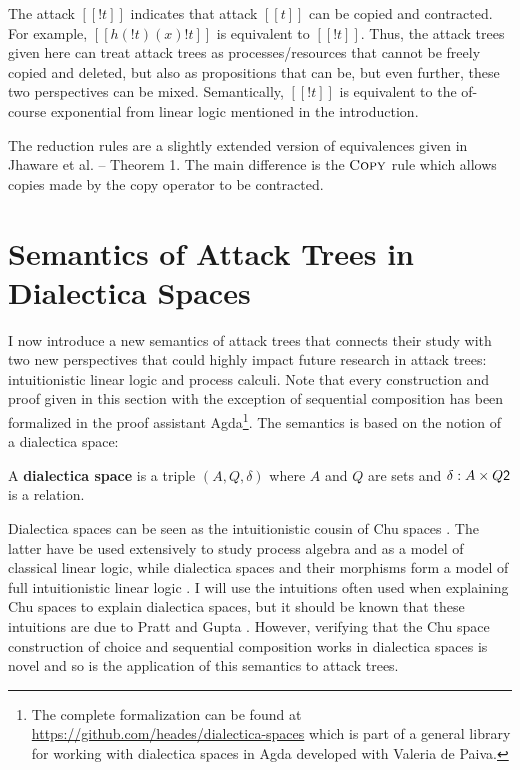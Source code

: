 \documentclass{llncs}
\let\to\relax
\newcommand{\to}{\rightarrow}
\begin{document}
The attack $[[! t]]$ indicates that attack $[[t]]$ can be copied and
contracted.  For example, $[[h(!t) (x) !t]]$ is equivalent to $[[!
    t]]$.  Thus, the attack trees given here can treat attack trees as
processes/resources that cannot be freely copied and deleted, but also
as propositions that can be, but even further, these two perspectives
can be mixed.  Semantically, $[[! t]]$ is equivalent to the of-course
exponential from linear logic mentioned in the introduction.

The reduction rules are a slightly extended version of equivalences
given in Jhaware et al. \cite{Jhawar:2015} -- Theorem 1.  The main
difference is the $\textsc{Copy}$ rule which allows copies made by the
copy operator to be contracted.

\section{Semantics of Attack Trees in Dialectica Spaces}
\label{sec:concrete_semantics_of_attack_trees_in_dialectica_spaces}

I now introduce a new semantics of attack trees that connects their
study with two new perspectives that could highly impact future
research in attack trees: intuitionistic linear logic and process
calculi.  Note that every construction and proof given in this section
with the exception of sequential composition has been formalized in
the proof assistant Agda\footnote{The complete formalization can be
  found at \url{https://github.com/heades/dialectica-spaces} which is
  part of a general library for working with dialectica spaces in Agda
  developed with Valeria de Paiva.}.  The semantics is based on the
notion of a dialectica space:

\begin{definition}
  \label{def:dialectica-space}
  A \textbf{dialectica space} is a triple $(A, Q, \delta)$ where $A$
  and $Q$ are sets and $\delta : A \times Q \to \mathsf{2}$ is a
  relation.
\end{definition}
Dialectica spaces can be seen as the intuitionistic cousin
\cite{dePaiva:2006b} of Chu spaces \cite{Pratt:1999}.  The latter have
be used extensively to study process algebra and as a model of
classical linear logic, while dialectica spaces and their morphisms
form a model of full intuitionistic linear logic
\cite{dePaiva:1987}. I will use the intuitions often used when
explaining Chu spaces to explain dialectica spaces, but it should be
known that these intuitions are due to Pratt and Gupta
\cite{Gupta:1994}.  However, verifying that the Chu space construction
of choice and sequential composition works in dialectica spaces is
novel and so is the application of this semantics to attack trees.
\end{document}
